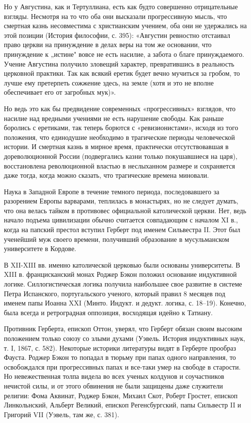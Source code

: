 Но  у  Августина,  как  и   Тертуллиана,  есть  как  будто  совершенно
отрицательные  взгляды.   Несмотря  на   то  что  оба   они  высказали
прогрессивную мысль,  что смертная  казнь несовместима  с христианским
учением, оба они не удержались  на этой позиции (История философии, с.
395):  «Августин ревностно  отстаивал  право церкви  на принуждение  в
делах веры  на том же основании,  что принуждение к „истине"  вовсе не
есть  насилие,  а  забота  о  благе  принуждаемого.  Учение  Августина
получило  зловещий  характер,  превратившись  в  реальность  церковной
практики. Так  как всякий  еретик будет вечно  мучиться за  гробом, то
лучше ему  претерпеть сожжение здесь, на  земле (хотя и это  не вполне
обеспечивает его от загробных мук)».

Но ведь  это как бы предвидение  современных «прогрессивных» взглядов,
что  насилие над  вредными  учениями не  есть  нарушение свободы.  Как
раньше боролись  с еретиками,  так теперь борются  с «ревизионистами»,
исходя  из того  положения,  что единодушие  необходимо в  трагические
периоды  человеческой  истории.  И  смертная  казнь  в  мирное  время,
практически  отсутствовавшая  в дореволюционной  России  (подвергались
казни  только  покушавшиеся   на  царя),  восстановлена  революционной
властью в  неслыханном размере и  сохраняется даже тогда,  когда можно
сказать, что трагические времена миновали.

Наука в Западной  Европе в течение темного  периода, последовавшего за
разорением  Европы варварами,  теплилась в  монастырях, но  не следует
думать, что  она велась  тайком в противовес  официальной католической
церкви.  Нет,   ведь  начало  подъема  цивилизации   обычно  считается
совпадающим с началом XI в.,  когда на папский престол вступил Герберт
под  именем Сильвестра  II.  Этот был  ученейший  муж своего  времени,
получивший образование в мусульманском университете в Кордове.

В   XII-XIII   вв.   именно  католической   церковью   были   основаны
университеты.  В XIII  в.  францисканский монах  Роджер Бэкон  положил
основание   индуктивной  логике.   Силлогистическая  логика   получила
наибольшее свое  развитие в  системе Петра  Испанского, португальского
ученого, который правил  8 месяцев под именем папы  Иоанна XXI (Минто.
Индукт.  и  дедукт.  логика,  с.   18--19).  Конечно,  была  всегда  и
ретроградная оппозиция, восходящая идейно к Татиану.

Противник Герберта,  епископ Оттон,  уверял, что Герберт  обязан своим
высоким  положением  только союзу  со  злыми  духами (Уэвель.  История
индуктивных наук, т.  I, 1867, с. 582).  Некоторые историки литературы
видят в Герберте прообраз Фауста. Роджер Бэкон то попадал в тюрьму при
папах одного  направления, то  освобождался при прогрессивных  папах и
все-таки умер на свободе в старости. Но невежественная толпа видела во
всех  ученых  колдунов  и  соучастников  нечистой  силы,  и  от  этого
обвинения  не  были защищены  даже  служители  религии: Фома  Аквинат,
Роджер  Бэкон,  Михаил  Скот, Роберт  Гростет,  епископ  Линкольнский,
Альберт Великий, епископ Регенсбургский,  папы Сильвестр II и Григорий
VII (Уэвель, там же, с. 381).

